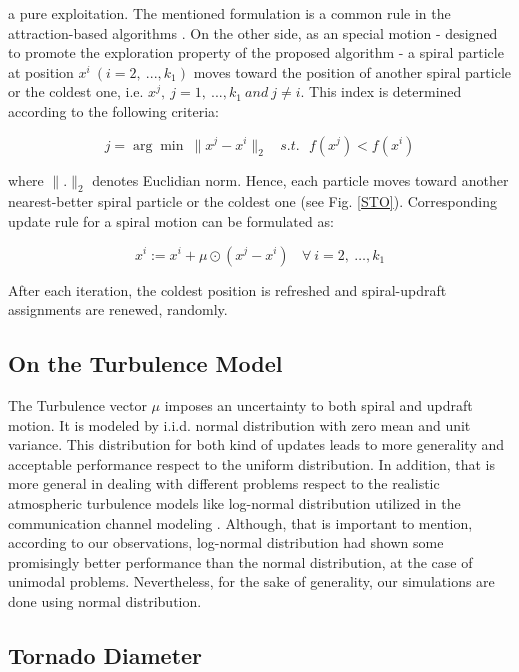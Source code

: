 \documentclass[conference]{IEEEtran}
\begin{document}
\noindent a pure exploitation. The mentioned formulation is a common rule in the attraction-based algorithms \cite{Yang15}. On the other side, as an special motion - designed to promote the exploration property of the proposed algorithm - a spiral particle at position $x^i~(i=2,~...,k_1)$ moves toward the position of another spiral particle or the coldest one, i.e. $x^j,~j=1,~...,k_1 ~and ~ j\neq i$. This index is determined according to the following criteria:

\begin{equation}\label{asan}
  j=\arg\min ~ \|x^j-x^i\|_2   ~ ~~~s.t. ~~~ f(x^j)<f(x^i)
\end{equation}

\noindent where $\|.\|_2$ denotes Euclidian norm. Hence, each particle moves toward another nearest-better spiral particle or the coldest one (see Fig. \ref{STO}). Corresponding update rule for a spiral motion can be formulated as:

\begin{equation}\label{mes}
  x^i := x^i+\mu\odot(x^j-x^i) ~ ~~~\forall~ i=2,~\ldots,k_1
\end{equation}

\noindent After each iteration, the coldest position is refreshed and spiral-updraft assignments are renewed, randomly.



\subsection{On the Turbulence Model}

The Turbulence vector $\mu$ imposes an uncertainty to both spiral and updraft motion. It is modeled by i.i.d. normal distribution with zero mean and unit variance. This distribution for both kind of updates leads to more generality and acceptable performance respect to the uniform distribution. In addition, that is more general in dealing with different problems respect to the realistic atmospheric turbulence models like log-normal distribution utilized in the communication channel modeling \cite{turbulence10}. Although, that is important to mention, according to our observations, log-normal distribution had shown some promisingly better performance than the normal distribution, at the case of unimodal problems. Nevertheless, for the sake of generality, our simulations are done using normal distribution.

\subsection{Tornado Diameter}
\end{document}
